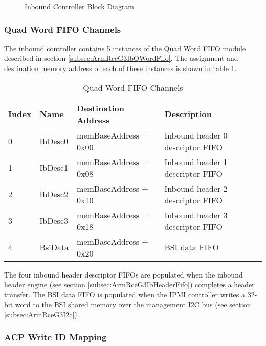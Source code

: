 \documentclass[11pt]{article}
\begin{document}
\begin{figure}[H]
   \centering
   \caption{Inbound Controller Block Diagram}
   \label{fig:ib_cntrl_block}
\end{figure}

\subsubsection{Quad Word FIFO Channels}

The inbound controller contains 5 instances of the Quad Word FIFO module described in section \ref{subsec:ArmRceG3IbQWordFifo}. The assignment and destination
memory address of each of these instances is shown in table \ref{tab:ib_qword_mappings}.

\begin{table}[H]
\small
\centering
   \begin{tabular}{| l | l | l | l | }
      \hline \textbf{Index} & \textbf{Name}  & \textbf{Destination Address} & \textbf{Description} \\
      \hline 0              & IbDesc0        & memBaseAddress + 0x00 &  Inbound header 0 descriptor FIFO \\
      \hline 1              & IbDesc1        & memBaseAddress + 0x08 &  Inbound header 1 descriptor FIFO \\
      \hline 2              & IbDesc2        & memBaseAddress + 0x10 &  Inbound header 2 descriptor FIFO \\
      \hline 3              & IbDesc3        & memBaseAddress + 0x18 &  Inbound header 3 descriptor FIFO \\
      \hline 4              & BsiData        & memBaseAddress + 0x20 &  BSI data FIFO                       \\
      \hline
   \end{tabular}
   \caption{Quad Word FIFO Channels}
   \label{tab:ib_qword_mappings}
\end{table}

The four inbound header descriptor FIFOs are populated when the inbound header engine (see section \ref{subsec:ArmRceG3IbHeaderFifo})
completes a header transfer. The BSI data FIFO is populated when the IPMI controller writes a 32-bit word to the
BSI shared memory over the management I2C bus (see section \ref{subsec:ArmRceG3I2c}). 

\subsubsection{ACP Write ID Mapping}
\end{document}
